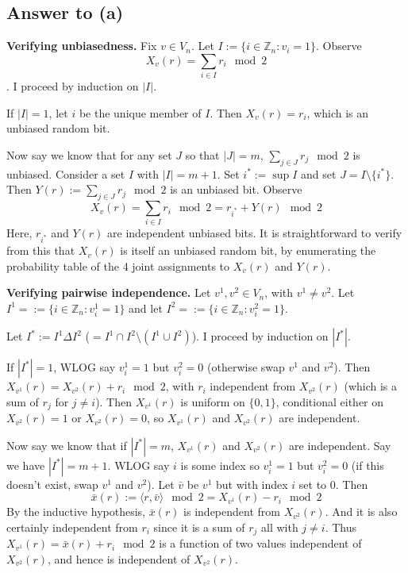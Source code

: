 \documentclass{article}
\begin{document}
\subsection*{Answer to (a)}

\textbf{Verifying unbiasedness.}
Fix $v \in V_n$.
Let $I := \{i \in \mathbb{Z}_n : v_i = 1\}$.
Observe $$X_v(r) = \sum_{i \in I} r_i \mod 2$$.
I proceed by induction on $|I|$.

If $|I| = 1$, let $i$ be the unique member of $I$.
Then $X_v(r) = r_i$, which is an unbiased random bit.

Now say we know that for any set $J$ so that $|J| = m$, $\sum_{j \in J} r_j \mod 2$ is unbiased.
Consider a set $I$ with $|I| = m + 1$.
Set $i^* := \sup I$ and set $J = I \setminus \{i^*\}$.
Then $Y(r) := \sum_{j \in J} r_j \mod 2$ is an unbiased bit.
Observe $$X_v(r) = \sum_{i \in I} r_i \mod 2 = r_{i^*} + Y(r) \mod 2$$
Here, $r_{i^*}$ and $Y(r)$ are independent unbiased bits.
It is straightforward to verify from this that $X_v(r)$ is itself an unbiased random bit, by enumerating the probability table of the 4 joint assignments to $X_v(r)$ and $Y(r)$.

\textbf{Verifying pairwise independence.}
Let $v^1, v^2 \in V_n$, with $v^1 \neq v^2$.
Let $I^1 = := \{i \in \mathbb{Z}_n : v^1_i = 1\}$ and let
$I^2 = := \{i \in \mathbb{Z}_n : v^2_i = 1\}$.


Let $I^* := I^1 \Delta I^2$ ($= I^1 \cap I^2 \setminus (I^1 \cup I^2)$).
I proceed by induction on $|I^*|$.

If $|I^*| = 1$, WLOG say $v^1_i = 1$ but $v^2_i = 0$ (otherwise swap $v^1$ and $v^2$).
Then $X_{v^1}(r) = X_{v^2}(r) + r_i \mod 2$, with $r_i$ independent from $X_{v^2}(r)$ (which is a sum of $r_j$ for $j \neq i$).
Then $X_{v^1}(r)$ is uniform on $\{0, 1\}$, conditional either on $X_{v^2}(r) = 1$ or $X_{v^2}(r) = 0$,
so $X_{v^1}(r)$ and $X_{v^2}(r)$ are independent.

Now say we know that if $|I^*| = m$, $X_{v^1}(r)$ and $X_{v^2}(r)$ are independent.
Say we have $|I^*| = m + 1$.
WLOG say $i$ is some index so $v^1_i = 1$ but $v^2_i = 0$ (if this doesn't exist, swap $v^1$ and $v^2$).
Let $\bar{v}$ be $v^1$ but with index $i$ set to 0.
Then $$\bar{x}(r) := \langle r, \bar{v} \rangle \mod 2 = X_{v^1}(r) - r_i \mod 2$$
By the inductive hypothesis, $\bar{x}(r)$ is independent from $X_{v^2}(r)$.
And it is also certainly independent from $r_i$ since it is a sum of $r_j$ all with $j \neq i$.
Thus $X_{v^1}(r) = \bar{x}(r) + r_i \mod 2$ is a function of two values independent of $X_{v^2}(r)$, and hence is independent of $X_{v^2}(r)$.
\end{document}
